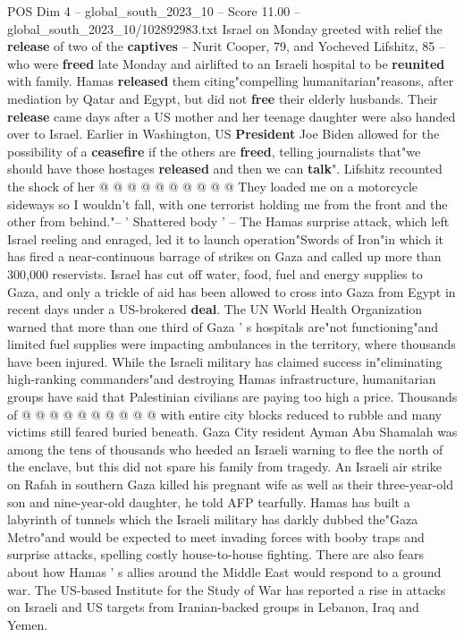 \begin{textsample}{POS Dim 4 – global\_south\_2023\_10 – Score 11.00 – global\_south\_2023\_10/102892983.txt}
Israel on Monday greeted with relief the \textbf{release} of two of the \textbf{captives} -- Nurit Cooper, 79, and Yocheved Lifshitz, 85 -- who were \textbf{freed} late Monday and airlifted to an Israeli hospital to be \textbf{reunited} with family.
Hamas \textbf{released} them citing"compelling humanitarian"reasons, after mediation by Qatar and Egypt, but did not \textbf{free} their elderly husbands.
Their \textbf{release} came days after a US mother and her teenage daughter were also handed over to Israel.
Earlier in Washington, US \textbf{President} Joe Biden allowed for the possibility of a \textbf{ceasefire} if the others are \textbf{freed}, telling journalists that"we should have those hostages \textbf{released} and then we can \textbf{talk}".
Lifshitz recounted the shock of her @ @ @ @ @ @ @ @ @ @ They loaded me on a motorcycle sideways so I wouldn't fall, with one terrorist holding me from the front and the other from behind."-- ' Shattered body ' -- The Hamas surprise attack, which left Israel reeling and enraged, led it to launch operation"Swords of Iron"in which it has fired a near-continuous barrage of strikes on Gaza and called up more than 300,000 reservists.
Israel has cut off water, food, fuel and energy supplies to Gaza, and only a trickle of aid has been allowed to cross into Gaza from Egypt in recent days under a US-brokered \textbf{deal}.
The UN World Health Organization warned that more than one third of Gaza ' s hospitals are"not functioning"and limited fuel supplies were impacting ambulances in the territory, where thousands have been injured.
While the Israeli military has claimed success in"eliminating high-ranking commanders"and destroying Hamas infrastructure, humanitarian groups have said that Palestinian civilians are paying too high a price.
Thousands of @ @ @ @ @ @ @ @ @ @ with entire city blocks reduced to rubble and many victims still feared buried beneath.
Gaza City resident Ayman Abu Shamalah was among the tens of thousands who heeded an Israeli warning to flee the north of the enclave, but this did not spare his family from tragedy.
An Israeli air strike on Rafah in southern Gaza killed his pregnant wife as well as their three-year-old son and nine-year-old daughter, he told AFP tearfully.
Hamas has built a labyrinth of tunnels which the Israeli military has darkly dubbed the"Gaza Metro"and would be expected to meet invading forces with booby traps and surprise attacks, spelling costly house-to-house fighting.
There are also fears about how Hamas ' s allies around the Middle East would respond to a ground war.
The US-based Institute for the Study of War has reported a rise in attacks on Israeli and US targets from Iranian-backed groups in Lebanon, Iraq and Yemen.

\end{textsample}
